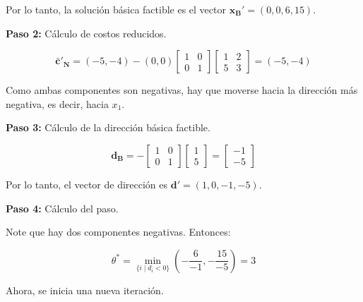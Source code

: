 \begin{enumerate}
    Por lo tanto, la solución básica factible es el vector $\mathbf{x}_{\mathbf{B}}' = (0,0,6,15)$.

\textbf{Paso 2:} Cálculo de costos reducidos.

    \begin{equation}
        \bar{\mathbf{c}}'_{\mathbf{N}}
        =
        (-5,-4)
        -
        (0,0)
        \begin{bmatrix}
            1 & 0 \\
            0 & 1
        \end{bmatrix}
        \begin{bmatrix}
            1 & 2 \\
            5 & 3
        \end{bmatrix}
        =
        (-5,-4)
    \end{equation}

    Como ambas componentes son negativas, hay que moverse hacia la dirección más negativa, es decir, hacia $x_1$.

\textbf{Paso 3:} Cálculo de la dirección básica factible.

    \begin{equation}
        \mathbf{d_B}
        =
        -
        \begin{bmatrix}
            1 & 0 \\
            0 & 1
        \end{bmatrix}
        \begin{bmatrix}
            1 \\
            5
        \end{bmatrix}
        =
        \begin{bmatrix}
            -1 \\
            -5
        \end{bmatrix}
    \end{equation}

    Por lo tanto, el vector de dirección es $\mathbf{d}' = (1,0,-1,-5)$.

\textbf{Paso 4:} Cálculo del paso.

    Note que hay dos componentes negativas. Entonces:

    \begin{equation}
        \theta^*
        =
        \min_{\{i \mid d_i < 0\}}
        \left(
        -\frac{6}{-1},
        -\frac{15}{-5}
        \right)
        =
        3
    \end{equation}

    Ahora, se inicia una nueva iteración.


\end{enumerate}
